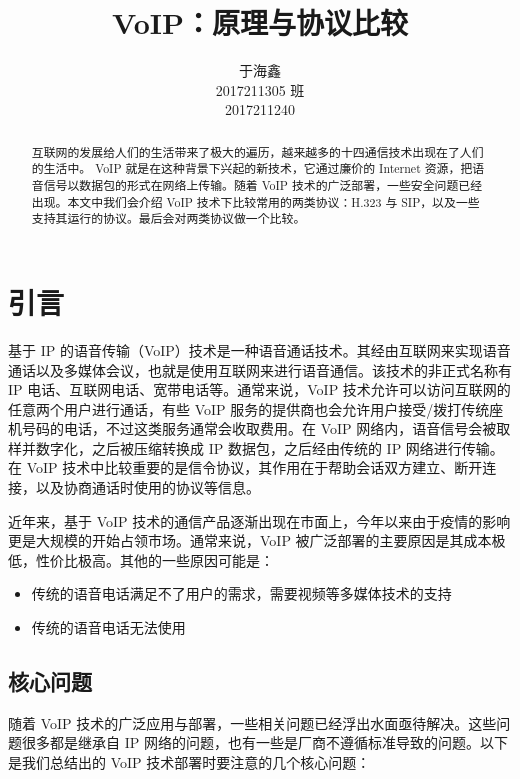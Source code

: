 \documentclass[lang=cn]{elegantpaper}
\title{VoIP：原理与协议比较}
\author{于海鑫 \\ 2017211305 班 \\ 2017211240}
\institute{北京邮电大学计算机学院}
\date{\zhtoday}
\begin{document}
\maketitle

\begin{abstract}
    互联网的发展给人们的生活带来了极大的遍历，越来越多的十四通信技术出现在了人们的生活中。 VoIP 就是在这种背景下兴起的新技术，它通过廉价的 Internet 资源，把语音信号以数据包的形式在网络上传输。随着 VoIP 技术的广泛部署，一些安全问题已经出现。本文中我们会介绍 VoIP 技术下比较常用的两类协议：H.323 与 SIP，以及一些支持其运行的协议。最后会对两类协议做一个比较。
\end{abstract}

\section{引言}

基于 IP 的语音传输（VoIP）技术\cite{goode2002voice}是一种语音通话技术。其经由互联网来实现语音通话以及多媒体会议，也就是使用互联网来进行语音通信。该技术的非正式名称有 IP 电话、互联网电话、宽带电话等。通常来说，VoIP 技术允许可以访问互联网的任意两个用户进行通话，有些 VoIP 服务的提供商也会允许用户接受/拨打传统座机号码的电话\cite{pershan2005methods}，不过这类服务通常会收取费用。在 VoIP 网络内，语音信号会被取样并数字化，之后被压缩转换成 IP 数据包，之后经由传统的 IP 网络进行传输。在 VoIP 技术中比较重要的是信令协议，其作用在于帮助会话双方建立、断开连接，以及协商通话时使用的协议等信息。

近年来，基于 VoIP 技术的通信产品逐渐出现在市面上，今年以来由于疫情的影响更是大规模的开始占领市场。通常来说，VoIP 被广泛部署的主要原因是其成本极低，性价比极高。其他的一些原因可能是：

\begin{itemize}
    \item 传统的语音电话满足不了用户的需求，需要视频等多媒体技术的支持
    \item 传统的语音电话无法使用
\end{itemize}

\subsection{核心问题}

随着 VoIP 技术的广泛应用与部署，一些相关问题已经浮出水面亟待解决。这些问题很多都是继承自 IP 网络的问题，也有一些是厂商不遵循标准导致的问题。以下是我们总结出的 VoIP 技术部署时要注意的几个核心问题：
\end{document}
